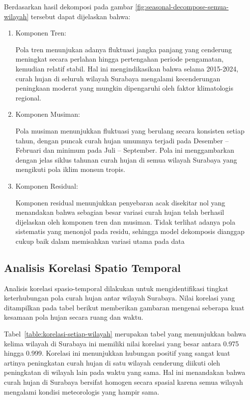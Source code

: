 Berdasarkan hasil dekomposi pada gambar \ref{fig:seasonal-decompose-semua-wilayah} tersebut dapat dijelaskan bahwa:
\begin{enumerate}[label=\alph*.]
    \item Komponen Tren:
    
        Pola tren menunjukan adanya fluktuasi jangka panjang yang cenderung meningkat secara perlahan hingga pertengahan periode pengamatan, kemudian relatif stabil. Hal ini mengindikasikan bahwa selama 2015-2024, curah hujan di seluruh wilayah Surabaya mengalami kecenderungan peningkaan moderat  yang mungkin dipengaruhi oleh faktor klimatologis regional.
        
    \item Komponen Musiman:
    
        Pola musiman menunjukkan fluktuasi yang berulang secara konsisten setiap tahun, dengan puncak curah hujan umumnya terjadi pada Desember – Februari dan minimum pada Juli – September. Pola ini menggambarkan dengan jelas siklus tahunan curah hujan di semua wilayah Surabaya yang mengikuti pola iklim monsun tropis.

    \item Komponen Residual:

        Komponen residual menunjukkan penyebaran acak disekitar nol yang menandakan bahwa sebagian besar variasi curah hujan telah berhasil dijelaskan oleh komponen tren dan musiman. Tidak terlihat adanya pola sistematis yang menonjol pada residu, sehingga model dekomposis dianggap cukup baik dalam memisahkan variasi utama pada data
\end{enumerate}

\subsection{Analisis Korelasi Spatio Temporal}
Analisis korelasi spasio-temporal dilakukan untuk mengidentifikasi tingkat keterhubungan pola curah hujan antar wilayah Surabaya.
Nilai korelasi yang ditampilkan pada tabel berikut memberikan gambaran mengenai seberapa kuat kesamaan pola hujan secara ruang dan waktu.


Tabel~\ref{table:korelasi-setiap-wilayah} merupakan tabel yang menunjukkan bahwa kelima wilayah di Surabaya ini memiliki nilai korelasi yang besar antara 0.975 hingga 0.999.
Korelasi ini menunjukkan hubungan positif yang sangat kuat artinya peningkatan curah hujan di satu wilayah cenderung diikuti oleh peningkatan di wilayah lain pada waktu yang sama.
Hal ini menandakan bahwa curah hujan di Surabaya bersifat homogen secara spasial karena semua wilayah mengalami kondisi meteorologis yang hampir sama.